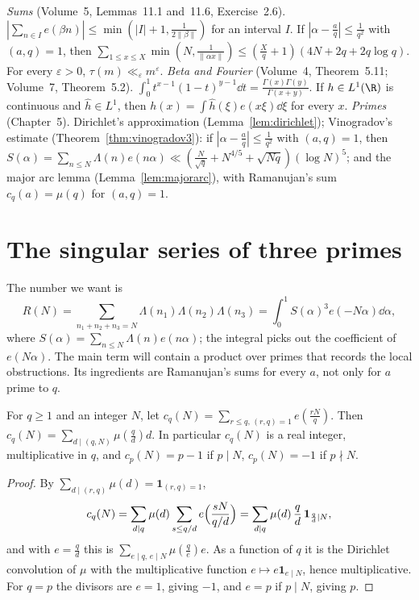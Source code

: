\begin{reminder}
\emph{Sums} (Volume~5, Lemmas~11.1 and~11.6, Exercise~2.6). $|\sum_{n\in I}e(\beta n)|\le\min(|I|+1,\frac1{2\|\beta\|})$ for an interval $I$. If $|\alpha-\frac aq|\le\frac1{q^2}$ with $(a,q)=1$, then $\sum_{1\le x\le X}\min(N,\frac1{\|\alpha x\|})\le(\frac Xq+1)(4N+2q+2q\log q)$. For every $\varepsilon>0$, $\tau(m)\ll_\varepsilon m^\varepsilon$.
\emph{Beta and Fourier} (Volume~4, Theorem~5.11; Volume~7, Theorem~5.2). $\int_0^1t^{x-1}(1-t)^{y-1}\dd t=\frac{\Gamma(x)\Gamma(y)}{\Gamma(x+y)}$. If $h\in L^1(\R)$ is continuous and $\hat h\in L^1$, then $h(x)=\int\hat h(\xi)e(x\xi)\dd\xi$ for every $x$.
\emph{Primes} (Chapter~5). Dirichlet's approximation (Lemma~\ref{lem:dirichlet}); Vinogradov's estimate (Theorem~\ref{thm:vinogradov3}): if $|\alpha-\frac aq|\le\frac1{q^2}$ with $(a,q)=1$, then $S(\alpha)=\sum_{n\le N}\Lambda(n)e(n\alpha)\ll(\frac N{\sqrt q}+N^{4/5}+\sqrt{Nq})(\log N)^5$; and the major arc lemma (Lemma~\ref{lem:majorarc}), with Ramanujan's sum $c_q(a)=\mu(q)$ for $(a,q)=1$.
\end{reminder}

\section{The singular series of three primes}

The number we want is
\[
R(N)=\sum_{n_1+n_2+n_3=N}\Lambda(n_1)\Lambda(n_2)\Lambda(n_3)=\int_0^1S(\alpha)^3e(-N\alpha)\dd\alpha,
\]
where $S(\alpha)=\sum_{n\le N}\Lambda(n)e(n\alpha)$; the integral picks out the coefficient of $e(N\alpha)$. The main term will contain a product over primes that records the local obstructions. Its ingredients are Ramanujan's sums for every $a$, not only for $a$ prime to $q$.

\begin{lemma}\label{lem:ramsum}
For $q\ge1$ and an integer $N$, let $c_q(N)=\sum_{r\le q,\,(r,q)=1}e(\frac{rN}q)$. Then $c_q(N)=\sum_{d\mid(q,N)}\mu(\frac qd)d$. In particular $c_q(N)$ is a real integer, multiplicative in $q$, and $c_p(N)=p-1$ if $p\mid N$, $c_p(N)=-1$ if $p\nmid N$.
\end{lemma}
\begin{proof}
By $\sum_{d\mid(r,q)}\mu(d)=\mathbf 1_{(r,q)=1}$,
\[
c_q(N)=\sum_{d\mid q}\mu(d)\sum_{s\le q/d}e\Bigl(\frac{sN}{q/d}\Bigr)=\sum_{d\mid q}\mu(d)\,\frac qd\,\mathbf 1_{\frac qd\mid N},
\]
and with $e=\frac qd$ this is $\sum_{e\mid q,\,e\mid N}\mu(\frac qe)e$. As a function of $q$ it is the Dirichlet convolution of $\mu$ with the multiplicative function $e\mapsto e\mathbf 1_{e\mid N}$, hence multiplicative. For $q=p$ the divisors are $e=1$, giving $-1$, and $e=p$ if $p\mid N$, giving $p$.
\end{proof}

